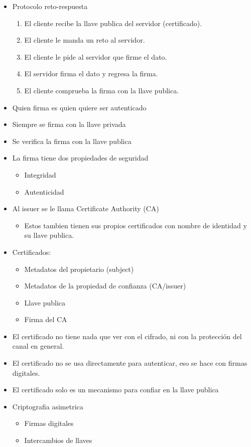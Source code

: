 \documentclass[11pt]{article}
\begin{document}
\begin{itemize}
\item Protocolo reto-respuesta
\begin{enumerate}
\item El cliente recibe la llave publica del servidor (certificado).
\item El cliente le manda un reto al servidor.
\item El cliente le pide al servidor que firme el dato.
\item El servidor firma el dato y regresa la firma.
\item El cliente comprueba la firma con la llave publica.
\end{enumerate}

\item Quien firma es quien quiere ser autenticado
\item Siempre se firma con la llave privada
\item Se verifica la firma con la llave publica

\item La firma tiene dos propiedades de seguridad
\begin{itemize}
\item Integridad
\item Autenticidad
\end{itemize}

\item Al issuer se le llama Certificate Authority (CA)
\begin{itemize}
\item Estos tambien tienen sus propios certificados con nombre de identidad y su llave publica.
\end{itemize}

\item Certificados:
\begin{itemize}
\item Metadatos del propietario (subject)
\item Metadatos de la propiedad de confianza (CA/issuer)
\item Llave publica
\item Firma del CA
\end{itemize}

\item El certificado no tiene nada que ver con el cifrado, ni con la protección del canal en general.
\item El certificado no se usa directamente para autenticar, eso se hace con firmas digitales.
\item El certificado solo es un mecanismo para confiar en la llave publica

\item Criptografia asimetrica
\begin{itemize}
\item Firmas digitales
\item Intercambios de llaves
\end{itemize}
\end{itemize}
\end{document}
